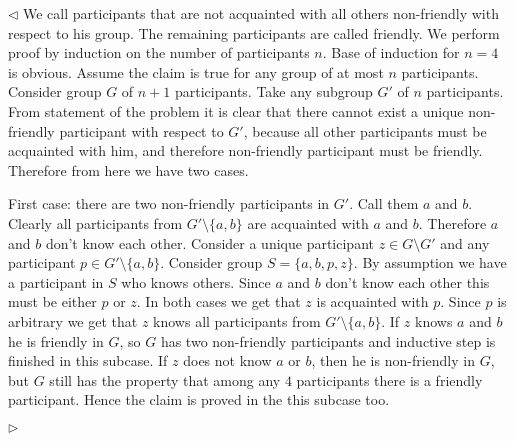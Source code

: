 \documentclass[12pt]{article}
\newenvironment{solution}{\par $\triangleleft$}{$\triangleright$}
\begin{document}
\begin{solution} We call participants that are not acquainted with all others non-friendly with respect to his group. The remaining participants are called friendly. We perform proof by induction on the number of participants $n$. Base of induction for $n=4$ is obvious. Assume the claim is true for any group of at most $n$ participants. Consider group $G$ of $n+1$ participants. Take any subgroup $G'$ of $n$ participants. From statement of the problem it is clear that there cannot exist a unique non-friendly participant with respect to $G'$, because all other participants must be acquainted with him, and therefore non-friendly participant must be friendly. Therefore from here we have two cases. 
 
First case: there are two non-friendly participants in $G'$. Call them $a$ and $b$. Clearly all participants from $G'\setminus\{a,b\}$ are acquainted with $a$ and $b$. Therefore $a$ and $b$ don't know each other. Consider a unique participant $z\in G\setminus G'$ and any participant $p\in G'\setminus\{a,b\}$. Consider group $S=\{a,b,p,z\}$. By assumption we have a participant in $S$ who knows others. Since $a$ and $b$ don't know each other this must be either $p$ or $z$. In both cases we get that $z$ is acquainted with $p$. Since $p$ is arbitrary we get that $z$ knows all participants from $G'\setminus\{a,b\}$. If $z$ knows $a$ and $b$ he is friendly in $G$, so $G$ has two non-friendly participants and inductive step is finished in this subcase. If $z$ does not know $a$ or $b$, then he is non-friendly in $G$, but $G$ still has the property that among any $4$ participants there is a friendly participant. Hence the claim is proved in the this subcase too. 
 

\end{solution}
\end{document}
